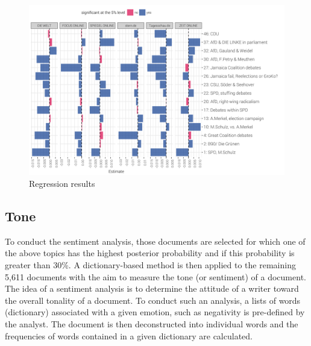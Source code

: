 \documentclass[12pt,a4paper,notitlepage]{article}
\begin{document}
\begin{figure}[H]
	\caption{Regression results}
		\begin{center}
			\includegraphics[width=\textwidth,keepaspectratio]{figs/estimates.png}
		\end{center}
	\label{fig_estimateEffects}
\end{figure}

\subsection{Tone}\label{subsection_tone}

To conduct the sentiment analysis, those documents are selected for which one of the above topics has the highest posterior probability and if this probability is greater than 30\%. A dictionary-based method is then applied to the remaining 5,611 documents with the aim to measure the tone (or sentiment) of a document. The idea of a sentiment analysis is to determine the attitude of a writer toward the overall tonality of a document. To conduct such an analysis, a lists of words (dictionary) associated with a given emotion, such as negativity is pre-defined by the analyst. The document is then deconstructed into individual words and the frequencies of words contained in a given dictionary are calculated. 
\end{document}
